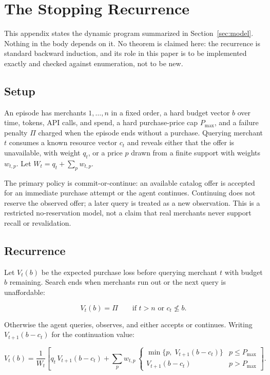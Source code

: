 \section{The Stopping Recurrence}
\label{app:proofs}

This appendix states the dynamic program summarized in Section~\ref{sec:model}.
Nothing in the body depends on it. No theorem is claimed here: the recurrence is
standard backward induction, and its role in this paper is to be implemented exactly
and checked against enumeration, not to be new.

\subsection{Setup}

An episode has merchants $1, \dots, n$ in a fixed order, a hard budget vector $b$
over time, tokens, API calls, and spend, a hard purchase-price cap $P_{\max}$, and a
failure penalty $\Pi$ charged when the episode ends without a purchase. Querying
merchant $t$ consumes a known resource vector $c_t$ and reveals either that the offer
is unavailable, with weight $q_t$, or a price $p$ drawn from a finite support with
weights $w_{t,p}$. Let $W_t = q_t + \sum_p w_{t,p}$.

The primary policy is commit-or-continue: an available catalog offer is accepted for
an immediate purchase attempt or the agent continues. Continuing does not reserve the
observed offer; a later query is treated as a new observation. This is a restricted
no-reservation model, not a claim that real merchants never support recall or
revalidation.

\subsection{Recurrence}

Let $V_t(b)$ be the expected purchase loss before querying merchant $t$ with budget
$b$ remaining. Search ends when merchants run out or the next query is unaffordable:

\begin{equation}
  V_t(b) = \Pi
  \qquad\text{if } t > n \text{ or } c_t \not\le b .
\end{equation}

Otherwise the agent queries, observes, and either accepts or continues. Writing
$V_{t+1}(b - c_t)$ for the continuation value:

\begin{equation}
  V_t(b) = \frac{1}{W_t}\left[
    q_t\,V_{t+1}(b - c_t)
    + \sum_{p} w_{t,p}\,
      \begin{cases}
        \min\{p,\; V_{t+1}(b - c_t)\} & p \le P_{\max} \\
        V_{t+1}(b - c_t) & p > P_{\max}
      \end{cases}
  \right].
\end{equation}

